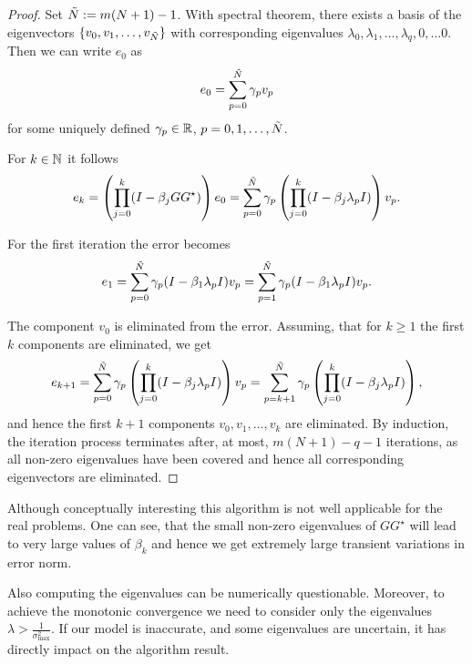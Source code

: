 \begin{proof} 
	Set $\tilde{N} := m(N+1) - 1$. With spectral theorem, there exists a basis of the eigenvectors $\{v_0, v_1, \dots, v_{\tilde{N}}\}$ with corresponding eigenvalues $\lambda_0, \lambda_1, \dots, \lambda_q, 0, \dots 0$. 
	Then we can write $e_0$ as 
	\begin{align}
	e_0 = \sum_{p = 0}^{\tilde{N}} \gamma_p v_p
	\end{align}
	for some uniquely defined $\gamma_p \in {\mathbb{R}}$, $p = 0, 1, \dots, \tilde{N}$. 
	
	For $k \in {\mathbb{N}}$ it follows 
	\begin{align}
	e_k = \left(\prod_{j=0}^k(I - \beta_j G G^\star)\right)e_0 = \sum_{p = 0}^{\tilde{N}} \gamma_p \left(\prod_{j=0}^k (I - \beta_j \lambda_p I)\right)v_p.
	\end{align}
	
	For the first iteration the error becomes 
	\begin{align}
	e_1 = \sum_{p = 0}^{\tilde{N}} \gamma_p ( I - \beta_1 \lambda_p I) v_p = \sum_{p=1}^{\tilde{N} } \gamma_p ( I - \beta_1 \lambda_p I) v_p.
	\end{align}
	
	The component $v_0$ is eliminated from the error.
	Assuming, that for $k \geq 1$ the first $k$ components are eliminated, we get 
	\begin{align}
	e_{k+1} = \sum_{p = 0}^{\tilde{N}} \gamma_p \left(\prod_{j=0}^k (I - \beta_j \lambda_p I)\right)v_p = \sum_{p = k + 1}^{\tilde{N}} \gamma_p \left(\prod_{j = 0}^k (I - \beta_j \lambda_p I )\right),
	\end{align}
	and hence the first $k+1$ components $v_0, v_1, \dots, v_k$ are eliminated. 
	By induction, the iteration process terminates after, at most,  $m(N+1) - q - 1$ iterations, as all non-zero eigenvalues have been covered and hence all corresponding eigenvectors are eliminated.	
\end{proof}

Although conceptually interesting this algorithm is not well applicable for the real problems. One can see, that the small non-zero eigenvalues of $GG^\star$ will lead to very large values of $\beta_k$ and hence we get extremely large transient variations in error norm. 

Also computing the eigenvalues can be numerically questionable. Moreover, to achieve the monotonic convergence we need to consider only the eigenvalues $\lambda > \frac{1}{\sigma_{\max}^2}$.
If our model is inaccurate, and some eigenvalues are uncertain, it has directly impact on the algorithm result. 


